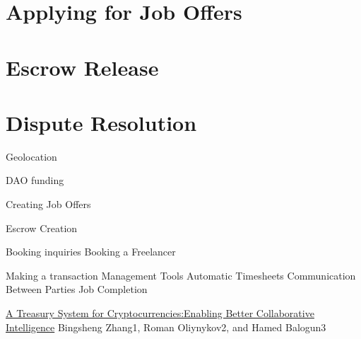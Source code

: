 \documentclass{article}
\begin{document}
\section{Applying for Job Offers}

\section{Escrow Release}

\section{Dispute Resolution}

Geolocation

DAO funding


Creating Job Offers



Escrow Creation

Booking inquiries
Booking a Freelancer

Making a transaction
Management Tools
Automatic Timesheets
Communication Between Parties
Job Completion


\begin{thebibliography}{99}

\href{https://www.lancaster.ac.uk/staff/zhangb2/treasury.pdf}{A Treasury System for Cryptocurrencies:Enabling Better Collaborative Intelligence}
Bingsheng Zhang1, Roman Oliynykov2, and Hamed Balogun3

\end{thebibliography}
\end{document}

